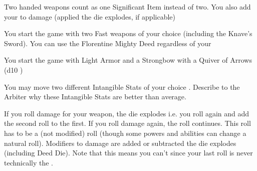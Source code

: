 {    


    Two handed weapons count as one Significant Item instead of two. You also add your \LVL to damage (applied  the die explodes, if applicable)


    You start the game with two Fast weapons of your choice (including the Knave's Sword).  You can use the Florentine Mighty Deed regardless of your \DEX


    You start the game with Light Armor and a Strongbow with a Quiver of Arrows (d10 \UD)


    You may move two different Intangible Stats of your choice \DCUP.  Describe to the Arbiter why these Intangible Stats are better than average.


    If you roll \MAX damage for your weapon, the die explodes i.e. you roll again and add the second roll to the first.  If you roll \MAX damage again, the roll continues.  This roll has to be a  (not modified) roll (though some powers and abilities can change a natural roll).  Modifiers to damage are added or subtracted    the die explodes (including Deed Die).  Note that this means you can't  since your last roll is never technically the \MAX. 



}
